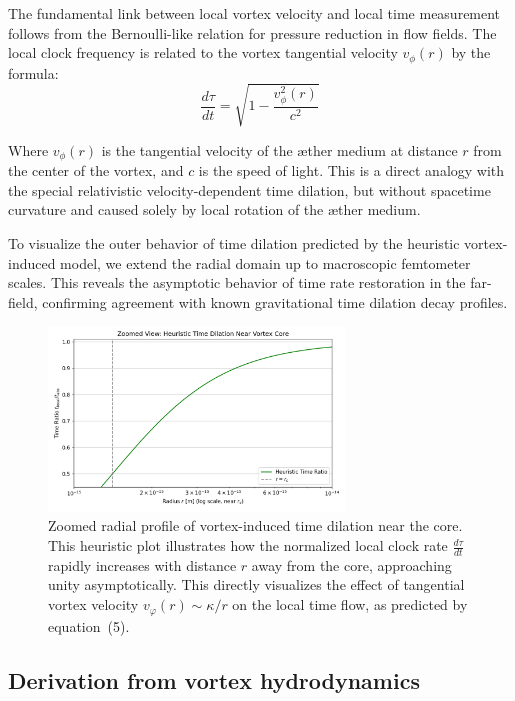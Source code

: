 The fundamental link between local vortex velocity and local time measurement follows from the Bernoulli-like relation for pressure reduction in flow fields. The local clock frequency is related to the vortex tangential velocity $v_{\phi}(r)$ by the formula:
\begin{equation}\label{eq:vortex_time_dilation}
\frac{d\tau}{dt} = \sqrt{1 - \frac{v_{\phi}^2(r)}{c^2}}
\end{equation}

Where $v_{\phi}(r)$ is the tangential velocity of the æther medium at distance $r$ from the center of the vortex, and $c$ is the speed of light. This is a direct analogy with the special relativistic velocity-dependent time dilation, but without spacetime curvature and caused solely by local rotation of the æther medium.

To visualize the outer behavior of time dilation predicted by the heuristic vortex-induced model, we extend the radial domain up to macroscopic femtometer scales. This reveals the asymptotic behavior of time rate restoration in the far-field, confirming agreement with known gravitational time dilation decay profiles.

\begin{figure}[H]
    \centering
    \includegraphics[width=0.7\textwidth]{06-HeuristicTimeDilation4}
    \caption{
        Zoomed radial profile of vortex-induced time dilation near the core.
        This heuristic plot illustrates how the normalized local clock rate
        $\frac{d\tau}{dt}$ rapidly increases with distance $r$ away from the core,
        approaching unity asymptotically. This directly visualizes the effect of
        tangential vortex velocity $v_\varphi(r) \sim \kappa / r$ on the local time flow,
        as predicted by equation~(5).
    }
    \label{fig:HeuristicTimeDilation}
\end{figure}

\subsection{Derivation from vortex hydrodynamics}

